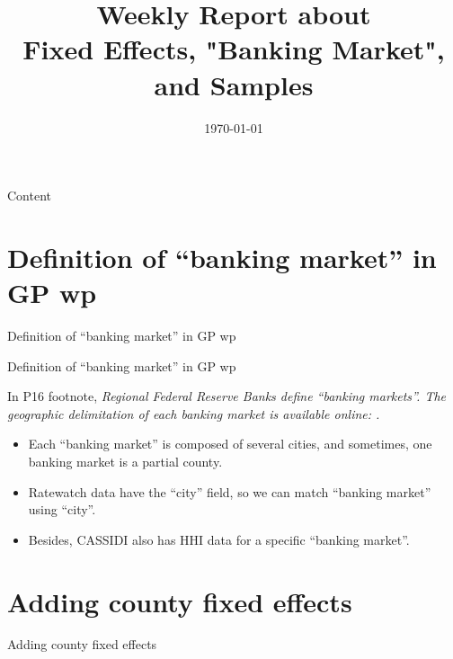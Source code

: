 \documentclass{beamer}
\title{Weekly Report about\\
Fixed Effects, "Banking Market", and Samples}
\date{\today}
\begin{document}
\begin{frame}
  \titlepage
\end{frame}




\begin{frame}{Content}
  \tableofcontents
\end{frame}


\section{Definition of “banking market” in GP wp}

\begin{frame}
    \vfill
    \centering
    {Definition of “banking market” in GP wp}
    \vfill
\end{frame}

\begin{frame}{Definition of “banking market” in GP wp}

In P16 footnote, \textit{Regional Federal Reserve Banks define “banking markets”. The geographic delimitation of each banking market is available online: \href{https://cassidi.stlouisfed.org/index}{}.}

\vspace{2em}

\begin{itemize}
    \item Each “banking market” is composed of several cities, and sometimes, one banking market is a partial county.
    \item Ratewatch data have the “city” field, so we can match “banking market” using “city”.
    \item Besides, CASSIDI also has HHI data for a specific “banking market”.
\end{itemize}

\end{frame}


\section{Adding county fixed effects}



\begin{frame}
    \vfill
    \centering
    {Adding county fixed effects}
    \vfill
\end{frame}
\end{document}
